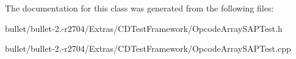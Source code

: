 The documentation for this class was generated from the following files\+:\begin{DoxyCompactItemize}
\item 
bullet/bullet-\/2.-\/r2704/\+Extras/\+C\+D\+Test\+Framework/Opcode\+Array\+S\+A\+P\+Test.\+h\item 
bullet/bullet-\/2.-\/r2704/\+Extras/\+C\+D\+Test\+Framework/Opcode\+Array\+S\+A\+P\+Test.\+cpp\end{DoxyCompactItemize}
